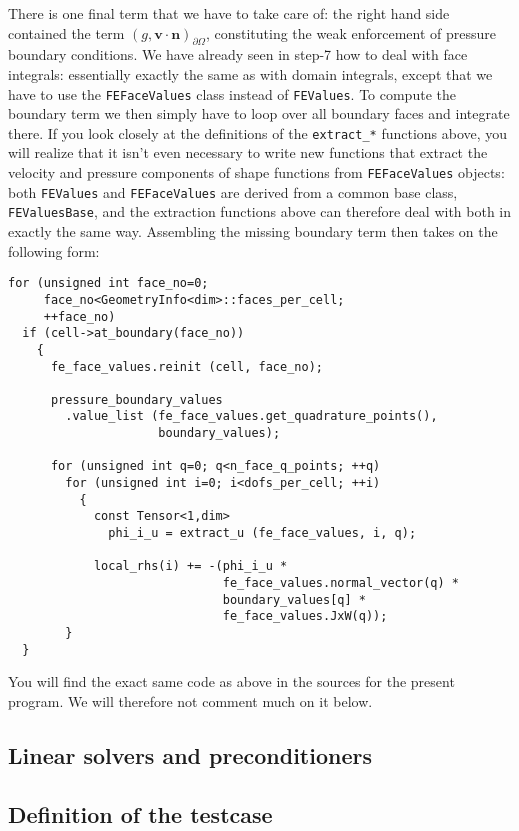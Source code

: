 \documentclass{article}
\renewcommand{\vec}[1]{\mathbf{#1}}
\begin{document}
There is one final term that we have to take care of: the right hand side
contained the term $(g,\vec v\cdot \vec n)_{\partial\Omega}$, constituting the
weak enforcement of pressure boundary conditions. We have already seen in
step-7 how to deal with face integrals: essentially exactly the same as with
domain integrals, except that we have to use the \texttt{FEFaceValues} class
instead of \texttt{FEValues}. To compute the boundary term we then simply have
to loop over all boundary faces and integrate there. If you look closely at
the definitions of the \texttt{extract\_*} functions above, you will realize
that it isn't even necessary to write new functions that extract the velocity
and pressure components of shape functions from \texttt{FEFaceValues} objects:
both \texttt{FEValues} and \texttt{FEFaceValues} are derived from a common
base class, \texttt{FEValuesBase}, and the extraction functions above can
therefore deal with both in exactly the same way. Assembling the missing
boundary term then takes on the following form:
\begin{verbatim}
for (unsigned int face_no=0;
     face_no<GeometryInfo<dim>::faces_per_cell;
     ++face_no)
  if (cell->at_boundary(face_no))
    {
      fe_face_values.reinit (cell, face_no);
    
      pressure_boundary_values
        .value_list (fe_face_values.get_quadrature_points(),
                     boundary_values);

      for (unsigned int q=0; q<n_face_q_points; ++q) 
        for (unsigned int i=0; i<dofs_per_cell; ++i)
          {
            const Tensor<1,dim>
              phi_i_u = extract_u (fe_face_values, i, q);
                
            local_rhs(i) += -(phi_i_u *
                              fe_face_values.normal_vector(q) *
                              boundary_values[q] *
                              fe_face_values.JxW(q));
        }
  }
\end{verbatim}

You will find the exact same code as above in the sources for the present
program. We will therefore not comment much on it below.


\subsection*{Linear solvers and preconditioners}



\subsection*{Definition of the testcase}
\end{document}
